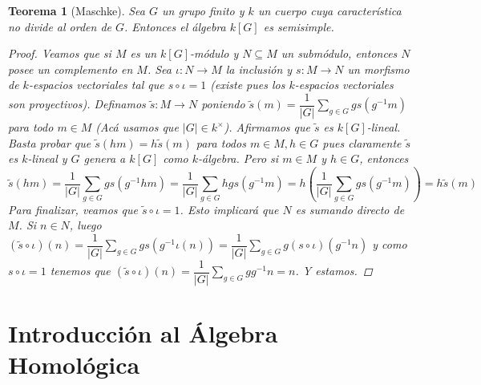 \documentclass[12pt]{book}
\newtheorem{teo}{Teorema}[section]
\theoremstyle{definition}
\begin{document}
\begin{teo}[Maschke]
Sea $G$ un grupo finito y $k$ un cuerpo cuya característica no divide al orden de $G$. Entonces el álgebra $k[G]$ es semisimple.
\begin{proof}
Veamos que si $M$ es un $k[G]$-módulo y $N\subseteq M$ un submódulo, entonces $N$ posee un complemento en $M$. Sea $\iota:N\to M$ la inclusión y $s:M\to N$ un morfismo de $k$-espacios vectoriales tal que $s\circ \iota =1$ (existe pues los $k$-espacios vectoriales son proyectivos). Definamos $\tilde{s}:M\to N$ poniendo $\tilde{s}(m) = \dfrac{1}{|G|}\displaystyle\sum_{g\in G}g s(g^{-1}m)$ para todo $m\in M$ (Acá usamos que $|G|\in k^\times$). Afirmamos que $\tilde{s}$ es $k[G]$-lineal. Basta probar que $\tilde{s}(hm)=h\tilde{s}(m)$ para todos $m\in M, h\in G$ pues claramente $\tilde{s}$ es $k$-lineal y $G$ genera a $k[G]$ como $k$-álgebra. Pero si $m\in M$ y $h\in G$, entonces $$\tilde{s}(hm) = \dfrac{1}{|G|}\displaystyle\sum_{g\in G}gs(g^{-1}hm) = \dfrac{1}{|G|}\sum_{g\in G}hgs(g^{-1}m) = h\left(\dfrac{1}{|G|}\sum_{g\in G}gs(g^{-1}m)\right)=h\tilde{s}(m)$$ Para finalizar, veamos que $\tilde{s}\circ \iota =1$. Esto implicará que $N$ es sumando directo de $M$. Si $n\in N$, luego $(\tilde{s}\circ\iota)(n) = \dfrac{1}{|G|}\displaystyle\sum_{g\in G}gs(g^{-1}\iota(n)) = \dfrac{1}{|G|}\sum_{g\in G}g(s\circ\iota)(g^{-1}n)$ y como $s\circ \iota =1$ tenemos que $(\tilde{s}\circ \iota)(n) = \dfrac{1}{|G|}\displaystyle\sum_{g\in G}gg^{-1}n = n$. Y estamos.
\end{proof}
\end{teo}

\section{Introducción al Álgebra Homológica}
\end{document}
